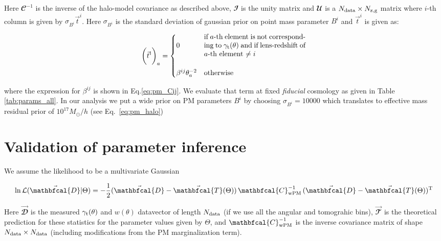 \documentclass[fleqn,usenatbib]{mnras}
\newcommand{\gammat}{\ensuremath{\gamma_{\rm t}(\theta)}}
\newcommand{\wtheta}{\ensuremath{w(\theta)}}
\begin{document}
Here ${\mathbfcal{C}}^{-1}$ is the inverse of the halo-model covariance as described above, $\mathbfcal{I}$ is the unity matrix and $\mathbfcal{U}$ is a $N_{\rm data} \times N_{\rm z,g}$ matrix where $i$-th column is given by $\sigma_{B^i} \vec{t}^{i}$. Here $\sigma_{B^i}$ is the standard deviation of gaussian prior on point mass parameter $B^i$ and $\vec{t}^{i}$ is given as:
\begin{linenomath*}
\begin{equation}
    \bigg(\vec{t}^{i} \bigg)_{a} = \begin{cases}
0 & \parbox{5cm}{if $a$-th element is not corresponding to $\gammat$ and if lens-redshift of $a$-th element $\neq i$} \\  
\\
\beta^{ij}\theta_{a}^{-2} &\text{otherwise}
\end{cases}
\end{equation}
\end{linenomath*}
where the expression for $\beta^{ij}$ is shown in Eq.\ref{eq:pm_Cij}. We evaluate that term at fixed \textit{fiducial} cosmology as given in Table \ref{tab:params_all}. In our analysis we put a wide prior on PM parameters $B^i$ by choosing $\sigma_{B^i} = 10000$ which translates to effective mass residual prior of $10^{17} M_{\odot}/h$ (see Eq.~\ref{eq:pm_halo})



\section{Validation of parameter inference}

We assume the likelihood to be a multivariate Gaussian
\begin{linenomath*}
\begin{equation}
    \ln \mathcal{L}(\vec{\mathbfcal{D}}|\Theta) = -\frac{1}{2} (\vec{\mathbfcal{D}} - \vec{\mathbfcal{T}}(\Theta)) \, {\mathbfcal{C}}^{-1}_{\rm wPM} \,  (\vec{\mathbfcal{D}} - \vec{\mathbfcal{T}}(\Theta))^{\rm T}
\end{equation}
\end{linenomath*}
Here $\vec{\mathbfcal{D}}$ is the measured $\gammat$ and $\wtheta$ datavector of length $N_{\rm data}$ (if we use all the angular and tomograhic bins), $\vec{\mathbfcal{T}}$ is the theoretical prediction for these statistics for the parameter values given by  $\Theta$, and ${\mathbfcal{C}}^{-1}_{\rm wPM}$ is the inverse covariance matrix of shape $N_{\rm data} \times N_{\rm data}$ (including modifications from the PM marginalization term).
\end{document}
